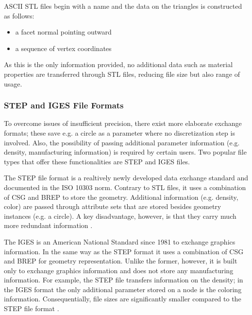 ASCII \ac{STL} files begin with a name and the data on the triangles is constructed as follows: 
\begin{itemize}
\item a facet normal pointing outward
\item a sequence of vertex coordinates
\end{itemize}
As this is the only information provided, no additional data such as material properties are transferred through \ac{STL} files, reducing file size but also range of usage.
\subsubsection{\acs{STEP} and \acs{IGES} File Formats}
To overcome issues of insufficient precision, there exist more elaborate exchange formats; these save e.g. a circle as a parameter where no discretization step is involved. Also, the possibility of passing additional parameter information (e.g. density, manufacturing information) is required by certain users. Two popular file types that offer these functionalities are \acf{STEP} and \acf{IGES} files. 

The \ac{STEP} file format is a realtively newly developed data exchange standard and documented in the ISO 10303 norm. Contrary to \ac{STL} files, it uses a combination of \ac{CSG} and \ac{BREP} to store the geometry. Additional information (e.g. density, color) are passed through attribute sets that are stored besides geometry instances (e.g. a circle). A key disadvantage, however, is that they carry much more redundant information \cite{STL}.


The \acl{IGES} is an American National Standard since 1981 to exchange graphics information. In the same way as the \ac{STEP} format it uses a combination of \ac{CSG} and \ac{BREP} for geometry representation. Unlike the former, however, it is built only to exchange graphics information and does not store any manufacturing information. For example, the \ac{STEP} file transfers information on the density; in the \ac{IGES} format the only additional parameter stored on a node is the coloring information. Consequentially, file sizes are significantly smaller compared to the \ac{STEP} file format \cite{STL}.

